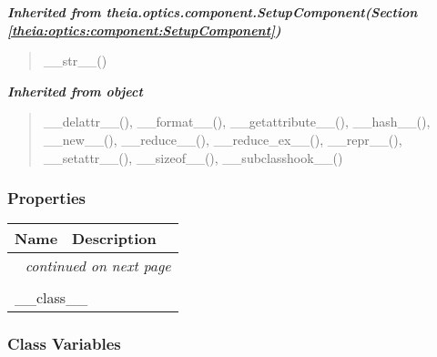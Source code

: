 \large{\textbf{\textit{Inherited from theia.optics.component.SetupComponent\textit{(Section \ref{theia:optics:component:SetupComponent})}}}}

\begin{quote}
\_\_str\_\_()
\end{quote}

\large{\textbf{\textit{Inherited from object}}}

\begin{quote}
\_\_delattr\_\_(), \_\_format\_\_(), \_\_getattribute\_\_(), \_\_hash\_\_(), \_\_new\_\_(), \_\_reduce\_\_(), \_\_reduce\_ex\_\_(), \_\_repr\_\_(), \_\_setattr\_\_(), \_\_sizeof\_\_(), \_\_subclasshook\_\_()
\end{quote}


  \subsubsection{Properties}

    \vspace{-1cm}
\hspace{\varindent}\begin{longtable}{|p{\varnamewidth}|p{\vardescrwidth}|l}
\cline{1-2}
\cline{1-2} \centering \textbf{Name} & \centering \textbf{Description}& \\
\cline{1-2}
\endhead\cline{1-2}\multicolumn{3}{r}{\small\textit{continued on next page}}\\\endfoot\cline{1-2}
\endlastfoot\multicolumn{2}{|l|}{\textit{Inherited from object}}\\
\multicolumn{2}{|p{\varwidth}|}{\raggedright \_\_class\_\_}\\
\cline{1-2}
\end{longtable}



  \subsubsection{Class Variables}

